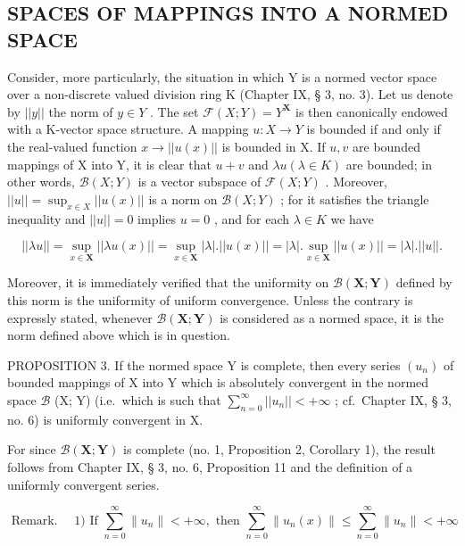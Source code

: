 \subsection{SPACES OF MAPPINGS INTO A NORMED SPACE}

Consider, more particularly, the situation in which Y is a normed vector space over a non-discrete valued division ring K (Chapter IX, § 3, no. 3). Let us denote by \(||y||\) the norm of \(y \in Y\) . The set \(\mathcal{F}(X;Y) = Y^{\mathbf{X}}\) is then canonically endowed with a K-vector space structure. A mapping \(u: X \to Y\) is bounded if and only if the real-valued function \(x \to ||u(x)||\) is bounded in X. If \(u, v\) are bounded mappings of X into Y, it is clear that \(u + v\) and \(\lambda u (\lambda \in K)\) are bounded; in other words, \(\mathcal{B}(X;Y)\) is a vector subspace of \(\mathcal{F}(X;Y)\) . Moreover, \(||u|| = \sup_{x \in X} ||u(x)||\) is a norm on \(\mathcal{B}(X;Y)\) ; for it satisfies the triangle inequality and \(||u|| = 0\) implies \(u = 0\) , and for each \(\lambda \in K\) we have

\[
| | \lambda u | | = \sup _ {x \in \mathbf {X}} | | \lambda u (x) | | = \sup _ {x \in \mathbf {X}} | \lambda |. | | u (x) | | = | \lambda |. \sup _ {x \in \mathbf {X}} | | u (x) | | = | \lambda |. | | u | |.
\]

Moreover, it is immediately verified that the uniformity on \(\mathcal{B}(\mathbf{X};\mathbf{Y})\) defined by this norm is the uniformity of uniform convergence. Unless the contrary is expressly stated, whenever \(\mathcal{B}(\mathbf{X};\mathbf{Y})\) is considered as a normed space, it is the norm defined above which is in question.

PROPOSITION 3. If the normed space Y is complete, then every series \((u_n)\) of bounded mappings of X into Y which is absolutely convergent in the normed space \(\mathcal{B}\) (X; Y) (i.e.~which is such that \(\sum_{n=0}^{\infty}||u_n|| < +\infty\) ; cf.~Chapter IX, § 3, no. 6) is uniformly convergent in X.

For since \(\mathcal{B}(\mathbf{X};\mathbf{Y})\) is complete (no. 1, Proposition 2, Corollary 1), the result follows from Chapter IX, § 3, no. 6, Proposition 11 and the definition of a uniformly convergent series.

\[
\text { Remark. } \quad 1) \text {   If   } \sum_ {n = 0} ^ {\infty} \| u _ {n} \| <   + \infty , \text {   then   } \sum_ {n = 0} ^ {\infty} \| u _ {n} (x) \| \leqslant \sum_ {n = 0} ^ {\infty} \| u _ {n} \| <   + \infty
\]


